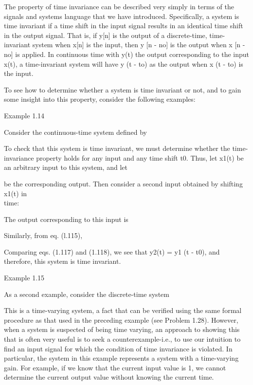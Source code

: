 \documentclass{report}
\begin{document}
The property of time invariance can be described very simply in terms of the signals and systems language that we have introduced. Specifically,
a system is time invariant if a time shift in the input signal results in an identical time shift in the output signal. That is, if y[n] is the output
of a discrete-time, time-invariant system when x[n] is the input, then y [n - no] is the output when x [n - no] is applied. In continuous time with
y(t) the output corresponding to the input x(t), a time-invariant system will have y (t - to) as the output when x (t - to) is the input.

To see how to determine whether a system is time invariant or not, and to gain some insight into this property, consider the following examples:

Example 1.14

Consider the continuous-time system defined by



To check that this system is time invariant, we must determine whether the time- invariance property holds for any input and any time shift t0. Thus,
let x1(t) be an arbitrary input to this system, and let



be the corresponding output. Then consider a second input obtained by shifting x1(t) in\\
time:



The output corresponding to this input is



Similarly, from eq. (l.115),



Comparing eqs. (1.117) and (1.118), we see that y2(t) = y1 (t - t0), and therefore, this system is time invariant.

Example 1.15

As a second example, consider the discrete-time system



This is a time-varying system, a fact that can be verified using the same formal procedure as that used in the preceding example (see Problem 1.28).
However, when a system is suspected of being time varying, an approach to showing this that is often very useful is to seek a counterexample-i.e.,
to use our intuition to find an input signal for which the condition of time invariance is violated. In particular, the system in this example represents
a system with a time-varying gain. For example, if we know that the current input value is 1, we cannot determine the current output value without
knowing the current time.
\end{document}
